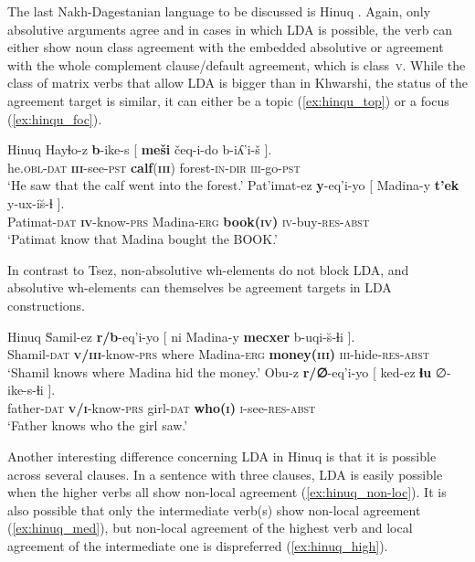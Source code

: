 \documentclass[output=paper
,modfonts
,nonflat]{langsci/langscibook}
\begin{document}
The last Nakh-Dagestanian language to be discussed is Hinuq \citep{Forker2012}. Again, only absolutive arguments agree and in cases in which LDA is possible, the verb can either show noun class agreement with the embedded absolutive or agreement with the whole complement clause/default agreement, which is class~\textsc{v}. While the class of matrix verbs that allow LDA is bigger than in Khwarshi, the status of the agreement target is similar, it can either be a topic (\ref{ex:hinqu_top}) or a focus (\ref{ex:hinqu_foc}).
\begin{exe}
\ex Hinuq \citep[][628]{Forker2012}
	\xlist
	\ex \label{ex:hinqu_top}
		\gll Hayɬo-z \textbf{b}-ike-s [ \textbf{me\v{s}i} \v{c}eq-i-do b-iʎ'i-\v{s} ].\\
			 he.\textsc{obl}-\textsc{dat} \textbf{\textsc{iii}}-see-\textsc{pst} {} \textbf{calf}(\textbf{\textsc{iii}}) forest-\textsc{in}-\textsc{dir} \textsc{iii}-go-\textsc{pst}\\
		\glt `He saw that the calf went into the forest.' 
	\ex  \label{ex:hinqu_foc}
		\gll Pat'imat-ez \textbf{y}-eq'i-yo [ Madina-y \textbf{t'ek} y-ux-i\u{s}-ɬ ].\\
			 Patimat-\textsc{dat} \textbf{\textsc{iv}}-know-\textsc{prs} {} Madina-\textsc{erg} \textbf{book(\textsc{iv})} \textsc{iv}-buy-\textsc{res-abst}\\
		\glt `Patimat know that Madina bought the BOOK.'
	\endxlist
\end{exe}
In contrast to Tsez, non-absolutive wh-elements do not block LDA, and absolutive wh-elements can themselves be agreement targets in LDA constructions.
\begin{exe}
\ex Hinuq \citep[][637]{Forker2012}
	\xlist
	\ex
		\gll \u{S}amil-ez \textbf{r/b}-eq'i-yo [ ni Madina-y \textbf{mecxer} b-uqi-\u{s}-ɬi ].\\
			 Shamil-\textsc{dat} \textbf{\textsc{v/iii}}-know-\textsc{prs} {} where Madina-\textsc{erg} \textbf{money(\textsc{iii})} \textsc{iii}-hide-\textsc{res-abst}\\
		\glt `Shamil knows where Madina hid the money.'
	\ex 
		\gll Obu-z \textbf{r/∅}-eq'i-yo [ ked-ez \textbf{ɬu} ∅-ike-s-ɬi ].\\
			 father-\textsc{dat} \textbf{\textsc{v/i}}-know-\textsc{prs} {} girl-\textsc{dat} \textbf{who(\textsc{i})} \textsc{i}-see-\textsc{res-abst}\\
		\glt `Father knows who the girl saw.'
	\endxlist
\end{exe}
Another interesting difference concerning LDA in Hinuq is that it is possible across several clauses. In a sentence with three clauses, LDA is easily possible when the higher verbs all show non-local agreement (\ref{ex:hinuq_non-loc}). It is also possible that only the intermediate verb(s) show non-local agreement (\ref{ex:hinuq_med}), but non-local agreement of the highest verb and local agreement of the intermediate one is dispreferred (\ref{ex:hinuq_high}).\largerpage
\end{document}
